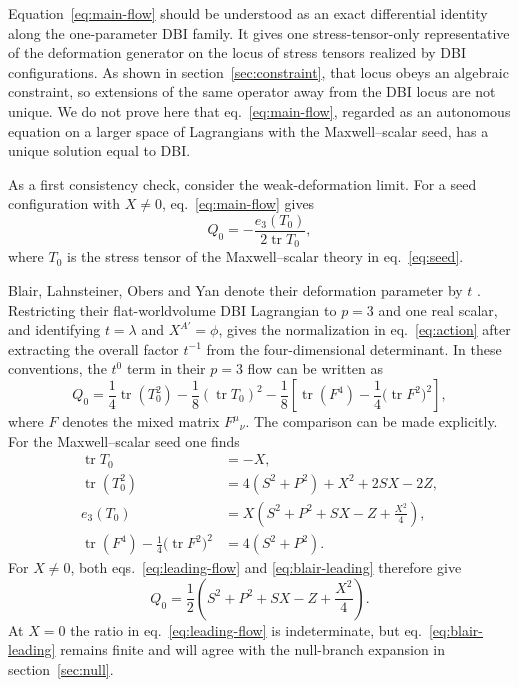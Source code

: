 \documentclass[a4paper,11pt]{article}
\numberwithin{equation}{section}
\newcommand{\tr}{\operatorname{tr}}
\begin{document}
Equation~\eqref{eq:main-flow} should be understood as an exact differential identity along the one-parameter DBI family. It gives one stress-tensor-only representative of the deformation generator on the locus of stress tensors realized by DBI configurations. As shown in section~\ref{sec:constraint}, that locus obeys an algebraic constraint, so extensions of the same operator away from the DBI locus are not unique. We do not prove here that eq.~\eqref{eq:main-flow}, regarded as an autonomous equation on a larger space of Lagrangians with the Maxwell--scalar seed, has a unique solution equal to DBI.

As a first consistency check, consider the weak-deformation limit. For a seed configuration with $X\neq0$, eq.~\eqref{eq:main-flow} gives
\begin{equation}
 Q_0=-\frac{e_3(T_0)}{2\tr T_0},
 \label{eq:leading-flow}
\end{equation}
where $T_0$ is the stress tensor of the Maxwell--scalar theory in eq.~\eqref{eq:seed}.

Blair, Lahnsteiner, Obers and Yan denote their deformation parameter by $t$ \cite{Blair2025}. Restricting their flat-worldvolume DBI Lagrangian to $p=3$ and one real scalar, and identifying $t=\lambda$ and $X^{A'}=\phi$, gives the normalization in eq.~\eqref{eq:action} after extracting the overall factor $t^{-1}$ from the four-dimensional determinant. In these conventions, the $t^0$ term in their $p=3$ flow can be written as
\begin{equation}
 Q_0
 =\frac14\tr(T_0^2)-\frac18(\tr T_0)^2
 -\frac18\left[\tr(F^4)-\frac14\bigl(\tr F^2\bigr)^2\right],
 \label{eq:blair-leading}
\end{equation}
where $F$ denotes the mixed matrix $F^\mu{}_{\nu}$. The comparison can be made explicitly. For the Maxwell--scalar seed one finds
\begin{align}
 \tr T_0&=-X,\nonumber\\
 \tr(T_0^2)&=4(S^2+P^2)+X^2+2SX-2Z,\nonumber\\
 e_3(T_0)&=X\left(S^2+P^2+SX-Z+\frac{X^2}{4}\right),\nonumber\\
 \tr(F^4)-\frac14\bigl(\tr F^2\bigr)^2&=4(S^2+P^2).
 \label{eq:seed-identities}
\end{align}
For $X\neq0$, both eqs.~\eqref{eq:leading-flow} and \eqref{eq:blair-leading} therefore give
\begin{equation}
 Q_0=\frac12\left(S^2+P^2+SX-Z+\frac{X^2}{4}\right).
 \label{eq:leading-flow-fields}
\end{equation}
At $X=0$ the ratio in eq.~\eqref{eq:leading-flow} is indeterminate, but eq.~\eqref{eq:blair-leading} remains finite and will agree with the null-branch expansion in section~\ref{sec:null}.
\end{document}
